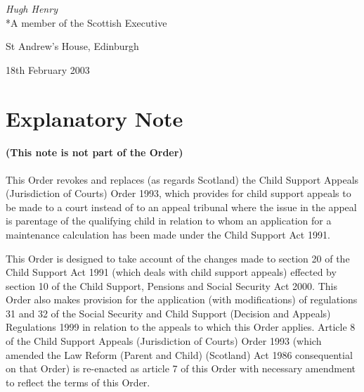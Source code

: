 \documentclass[12pt,a4paper]{article}
\begin{document}

{\raggedleft
\emph{Hugh Henry}\\*A member of the Scottish Executive%

}

St Andrew's House, Edinburgh

18th February 2003

\small

\part{Explanatory Note}

\renewcommand\parthead{— Explanatory Note}

\subsection*{(This note is not part of the Order)}

This Order revokes and replaces (as regards Scotland) the Child Support Appeals (Jurisdiction of Courts) Order 1993, which provides for child support appeals to be made to a court instead of to an appeal tribunal where the issue in the appeal is parentage of the qualifying child in relation to whom an application for a maintenance calculation has been made under the Child Support Act 1991.

This Order is designed to take account of the changes made to section 20 of the Child Support Act 1991 (which deals with child support appeals) effected by section 10 of the Child Support, Pensions and Social Security Act 2000. This Order also makes provision for the application (with modifications) of regulations 31 and 32 of the Social Security and Child Support (Decision and Appeals) Regulations 1999 in relation to the appeals to which this Order applies. Article 8 of the Child Support Appeals (Jurisdiction of Courts) Order 1993 (which amended the Law Reform (Parent and Child) (Scotland) Act 1986 consequential on that Order) is re-enacted as article 7 of this Order with necessary amendment to reflect the terms of this Order.  
\end{document}
